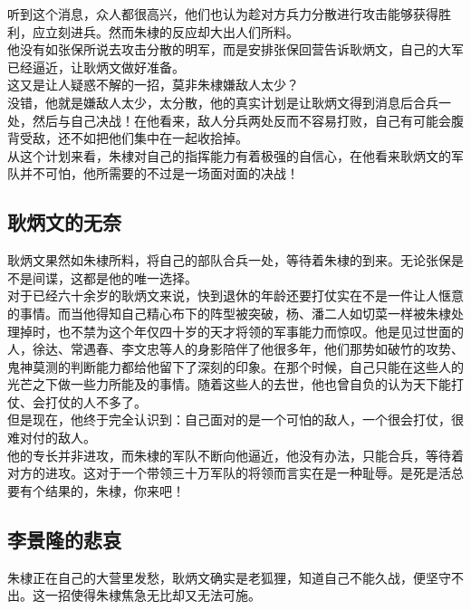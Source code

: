 \begin{multicols}{\theparacolNo}
听到这个消息，众人都很高兴，他们也认为趁对方兵力分散进行攻击能够获得胜利，应立刻进兵。然而朱棣的反应却大出人们所料。\\

他没有如张保所说去攻击分散的明军，而是安排张保回营告诉耿炳文，自己的大军已经逼近，让耿炳文做好准备。\\

这又是让人疑惑不解的一招，莫非朱棣嫌敌人太少？\\

没错，他就是嫌敌人太少，太分散，他的真实计划是让耿炳文得到消息后合兵一处，然后与自己决战！在他看来，敌人分兵两处反而不容易打败，自己有可能会腹背受敌，还不如把他们集中在一起收拾掉。\\

从这个计划来看，朱棣对自己的指挥能力有着极强的自信心，在他看来耿炳文的军队并不可怕，他所需要的不过是一场面对面的决战！\\

\subsection{耿炳文的无奈}
耿炳文果然如朱棣所料，将自己的部队合兵一处，等待着朱棣的到来。无论张保是不是间谍，这都是他的唯一选择。\\

对于已经六十余岁的耿炳文来说，快到退休的年龄还要打仗实在不是一件让人惬意的事情。而当他得知自己精心布下的阵型被突破，杨、潘二人如切菜一样被朱棣处理掉时，也不禁为这个年仅四十岁的天才将领的军事能力而惊叹。他是见过世面的人，徐达、常遇春、李文忠等人的身影陪伴了他很多年，他们那势如破竹的攻势、鬼神莫测的判断能力都给他留下了深刻的印象。在那个时候，自己只能在这些人的光芒之下做一些力所能及的事情。随着这些人的去世，他也曾自负的认为天下能打仗、会打仗的人不多了。\\

但是现在，他终于完全认识到：自己面对的是一个可怕的敌人，一个很会打仗，很难对付的敌人。\\

他的专长并非进攻，而朱棣的军队不断向他逼近，他没有办法，只能合兵，等待着对方的进攻。这对于一个带领三十万军队的将领而言实在是一种耻辱。是死是活总要有个结果的，朱棣，你来吧！\\

\subsection{李景隆的悲哀}
朱棣正在自己的大营里发愁，耿炳文确实是老狐狸，知道自己不能久战，便坚守不出。这一招使得朱棣焦急无比却又无法可施。\\


\end{multicols}
